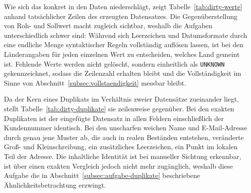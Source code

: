 Wie sich das konkret in den Daten niederschlägt, zeigt Tabelle~\ref{tab:dirty-werte} anhand tatsächlicher Zeilen des erzeugten Datensatzes. Die Gegenüberstellung von Roh- und Sollwert macht zugleich sichtbar, weshalb die Aufgaben unterschiedlich schwer sind: Während sich Leerzeichen und Datumsformate durch eine endliche Menge syntaktischer \newline Regeln vollständig auflösen lassen, ist bei den Länderangaben für jeden einzelnen Wert zu entscheiden, welches Land gemeint ist. Fehlende Werte werden nicht gelöscht, sondern einheitlich als \texttt{UNKNOWN} gekennzeichnet, sodass die Zeilenzahl erhalten bleibt und die Vollständigkeit im Sinne von Abschnitt~\ref{subsec:vollstaendigkeit} messbar bleibt.

Da der Kern eines Duplikats im Verhältnis zweier Datensätze zueinander liegt, stellt Tabelle~\ref{tab:dirty-duplikate} sie zeilenweise gegenüber. Bei den exakten Duplikaten ist der eingefügte Datensatz in allen Feldern einschließlich der Kundennummer identisch. Bei den unscharfen weichen Name und E-Mail-Adresse durch genau jene Muster ab, die auch in realen Beständen entstehen, veränderte Groß- und Kleinschreibung, ein zusätzliches Leerzeichen, ein Punkt im lokalen Teil der Adresse. Die inhaltliche Identität ist bei manueller Sichtung erkennbar, ist über einen exakten Vergleich jedoch nicht mehr zugänglich, weshalb diese Aufgabe die in Abschnitt~\ref{subsec:aufgabe-duplikate} beschriebene Ähnlichkeitsbetrachtung erzwingt.

